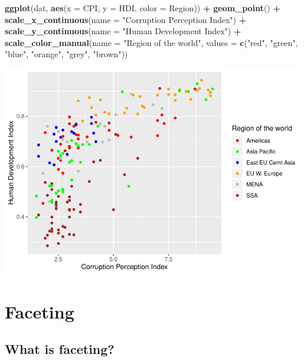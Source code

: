 \documentclass[]{book}
\newenvironment{Shaded}{\begin{snugshade}}{\end{snugshade}}
\newcommand{\DataTypeTok}[1]{\textcolor[rgb]{0.13,0.29,0.53}{#1}}
\newcommand{\KeywordTok}[1]{\textcolor[rgb]{0.13,0.29,0.53}{\textbf{#1}}}
\newcommand{\NormalTok}[1]{#1}
\newcommand{\OperatorTok}[1]{\textcolor[rgb]{0.81,0.36,0.00}{\textbf{#1}}}
\newcommand{\StringTok}[1]{\textcolor[rgb]{0.31,0.60,0.02}{#1}}
\begin{document}
\begin{Shaded}
\begin{Highlighting}[]
\KeywordTok{ggplot}\NormalTok{(dat, }\KeywordTok{aes}\NormalTok{(}\DataTypeTok{x =}\NormalTok{ CPI, }\DataTypeTok{y =}\NormalTok{ HDI, }\DataTypeTok{color =}\NormalTok{ Region)) }\OperatorTok{+}
\StringTok{  }\KeywordTok{geom_point}\NormalTok{() }\OperatorTok{+}
\StringTok{  }\KeywordTok{scale_x_continuous}\NormalTok{(}\DataTypeTok{name =} \StringTok{"Corruption Perception Index"}\NormalTok{) }\OperatorTok{+}
\StringTok{  }\KeywordTok{scale_y_continuous}\NormalTok{(}\DataTypeTok{name =} \StringTok{"Human Development Index"}\NormalTok{) }\OperatorTok{+}
\StringTok{  }\KeywordTok{scale_color_manual}\NormalTok{(}\DataTypeTok{name =} \StringTok{"Region of the world"}\NormalTok{,}
                     \DataTypeTok{values =} \KeywordTok{c}\NormalTok{(}\StringTok{"red"}\NormalTok{, }\StringTok{"green"}\NormalTok{, }\StringTok{"blue"}\NormalTok{, }\StringTok{"orange"}\NormalTok{, }\StringTok{"grey"}\NormalTok{, }\StringTok{"brown"}\NormalTok{))}
\end{Highlighting}
\end{Shaded}

\includegraphics{R/Rgraphics/figures/unnamed-chunk-191-1.pdf}

\hypertarget{faceting}{%
\section{Faceting}\label{faceting}}

\hypertarget{what-is-faceting}{%
\subsection{What is faceting?}\label{what-is-faceting}}
\end{document}
